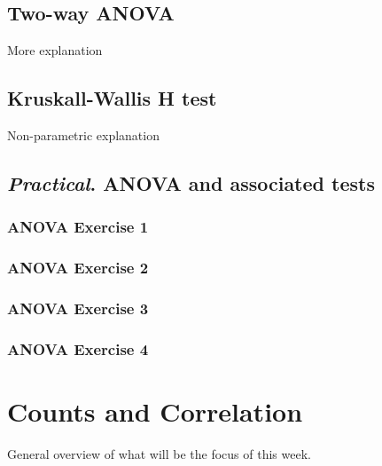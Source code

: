 \documentclass[
]{book}
\begin{document}
\hypertarget{two-way-anova}{%
\chapter{Two-way ANOVA}\label{two-way-anova}}

More explanation

\hypertarget{kruskall-wallis-h-test}{%
\chapter{Kruskall-Wallis H test}\label{kruskall-wallis-h-test}}

Non-parametric explanation

\hypertarget{practical.-anova-and-associated-tests}{%
\chapter{\texorpdfstring{\emph{Practical}. ANOVA and associated tests}{Practical. ANOVA and associated tests}}\label{practical.-anova-and-associated-tests}}

\hypertarget{anova-exercise-1}{%
\section{ANOVA Exercise 1}\label{anova-exercise-1}}

\hypertarget{anova-exercise-2}{%
\section{ANOVA Exercise 2}\label{anova-exercise-2}}

\hypertarget{anova-exercise-3}{%
\section{ANOVA Exercise 3}\label{anova-exercise-3}}

\hypertarget{anova-exercise-4}{%
\section{ANOVA Exercise 4}\label{anova-exercise-4}}

\hypertarget{part-counts-and-correlation}{%
\part{Counts and Correlation}\label{part-counts-and-correlation}}

General overview of what will be the focus of this week.
\end{document}
